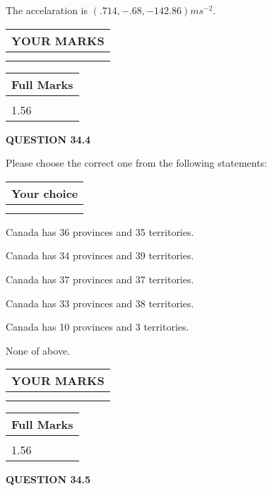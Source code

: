 \documentclass[12pt]{article}
\begin{document}
 
The accelaration is $  %
(
.714,
-.68,
-142.86)
ms^{-2} $.
 
 
 

 

 
\vspace{0.3in}
  
\vspace{0.2in}
  
\noindent\begin{tabular}{|l|}
\hline
 YOUR MARKS  \\
\hline
 \\ 
 \\ 
\hline
\end{tabular}
\hspace{0.05in} \begin{tabular}{|l|}
\hline
 Full Marks  \\
\hline
 \\ 
1.56 \\
\hline
\end{tabular}
{\textbf{\Large{QUESTION
34.4 
}}}
  
  
Please choose the correct one from the following statements:
  
  
\noindent\hspace{3.0in} \begin{tabular}{|l|}
\hline
Your choice \\
\hline
 \\ 
 \\ 
\hline
\end{tabular}
  
  
 
 
Canada has  %
36 provinces and  %
35 territories.
 
 
Canada has  %
34 provinces and  %
39 territories.
 
 
Canada has  %
37 provinces and  %
37 territories.
 
 
Canada has  %
33 provinces and  %
38 territories.
 
 
Canada has  %
10 provinces and  %
3 territories.
 
 
 None of above.
 
 
  
\vspace{0.2in}
  
\noindent\begin{tabular}{|l|}
\hline
 YOUR MARKS  \\
\hline
 \\ 
 \\ 
\hline
\end{tabular}
\hspace{0.05in} \begin{tabular}{|l|}
\hline
 Full Marks  \\
\hline
 \\ 
1.56 \\
\hline
\end{tabular}
{\textbf{\Large{QUESTION
34.5 
}}}
  
\end{document}
